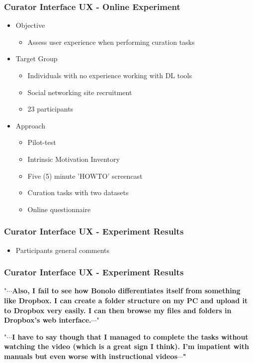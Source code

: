 \documentclass[xcolor=dvitex,t,11pt]{beamer}
\begin{document}
\begin{frame}[fragile]
\frametitle{Curator Interface UX - Online Experiment}
\begin{itemize}
\item<1-> Objective
\begin{itemize}
\item<2-> Assess user experience when performing curation tasks
\end{itemize}
\item<3-> Target Group
\begin{itemize}
\item<4-> Individuals with no experience working with DL tools
\item<5-> Social networking site recruitment
\item<6-> 23 participants
\end{itemize}
\item<6-> Approach
\begin{itemize}
\item<7-> Pilot-test
\item<8-> Intrinsic Motivation Inventory
\item<9-> Five (5) minute 'HOWTO' screencast
\item<10-> Curation tasks with two datasets
\item<11-> Online questionnaire
\end{itemize}
\end{itemize}
\end{frame}


\begin{frame}[fragile]
\frametitle{Curator Interface UX - Experiment Results}
\centering

\end{frame}


\begin{frame}[fragile]

\begin{itemize}
\item Participants general comments
\end{itemize}

\frametitle{Curator Interface UX - Experiment Results}
"\textbf{$\cdots$Also, I fail to see how Bonolo differentiates itself from something like Dropbox. I can create a folder structure on my PC and upload it to Dropbox very easily. I can then browse my files and folders in Dropbox's web interface.$\cdots$}"\\

\bigskip

"\textbf{$\cdots$I have to say though that I managed to complete the tasks without watching the video (which is a great sign I think). I'm impatient with manuals but even worse with instructional videos$\cdots$"}
\end{frame}
\end{document}
